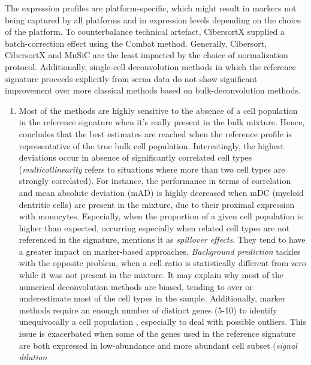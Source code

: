 The expression profiles are platform-specific, which might result in
markers not being captured by all platforms and in expression levels
depending on the choice of the platform. To counterbalance technical
artefact, CibersortX \autocite{newman_etal19} supplied a batch-correction effect using the Combat
method. Generally, Cibersort, CibersortX and MuSiC are the least
impacted by the choice of normalization protocol. Additionally,
single-cell deconvolution methods in which the reference signature
proceeds explicitly from  \acrshort{scrna} data do not show significant
improvement over more classical methods based on bulk-deconvolution
methods.

\begin{enumerate}
\def\labelenumi{\arabic{enumi}.}
\setcounter{enumi}{2}

\item
  Most of the methods are highly sensitive to the absence of a cell
  population in the reference signature when it's really present in the
  bulk mixture. Hence, \autocite{sturm_etal19} concludes that the best estimates are reached when the
  reference profile is representative of the true bulk cell population.
  Interestingly, the highest deviations occur in absence of
  significantly correlated cell types (\emph{multicollinearity} refers
  to situations where more than two cell types are strongly correlated).
  For instance, the performance in terms of correlation and mean
  absolute deviation (mAD) is highly decreased when mDC (myeloid
  dentritic cells) are present in the mixture, due to their proximal
  expression with monocytes. Especially, when the proportion of a given
  cell population is higher than expected, occurring especially when
  related cell types are not referenced in the signature,
  \autocite{sturm_etal19} mentions it
  as \emph{spillover effects}. They tend to have a greater impact on
  marker-based approaches. \emph{Background prediction} tackles with the
  opposite problem, when a cell ratio is statistically different from zero while it was not present in the mixture. It may explain why most of the numerical deconvolution methods are
  biased, tending to over or underestimate most of the cell types in the
  sample. Additionally, marker methods require an enough number of distinct
  genes (5-10) to identify unequivocally a cell population
  \autocite{ahn_etal13}, especially to
  deal with possible outliers. This issue is exacerbated when some of
  the genes used in the reference signature are both expressed in
  low-abundance and more abundant cell subset (\emph{signal dilution
}
\end{enumerate}

